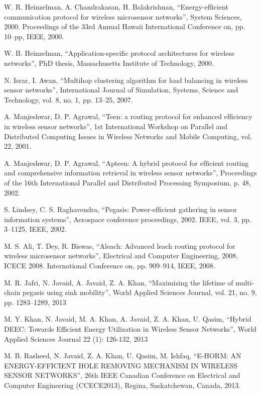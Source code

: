 \documentclass[journal]{IEEEtran}
\begin{document}
\begin{thebibliography}{1}
W. R. Heinzelman, A. Chandrakasan, H. Balakrishnan, ``Energy-efﬁcient communication protocol for wireless microsensor networks'', System Sciences, 2000. Proceedings of the 33rd Annual Hawaii International Conference on, pp. 10–pp, IEEE, 2000.

W. B. Heinzelman, ``Application-speciﬁc protocol architectures for wireless networks'', PhD thesis, Massachusetts Institute of Technology, 2000.

N. Israr, I. Awan, ``Multihop clustering algorithm for load balancing in wireless sensor networks'', International Journal of Simulation, Systems, Science and Technology, vol. 8, no. 1, pp. 13–25, 2007.

A. Manjeshwar, D. P. Agrawal, ``Teen: a routing protocol for enhanced efﬁciency in wireless sensor networks'', 1st International Workshop on Parallel and Distributed Computing Issues in Wireless Networks and Mobile Computing, vol. 22, 2001.

A. Manjeshwar, D. P. Agrawal, ``Apteen: A hybrid protocol for efﬁcient routing and comprehensive information retrieval in wireless sensor networks'', Proceedings of the 16th International Parallel and Distributed Processing Symposium, p. 48, 2002.

S. Lindsey, C. S. Raghavendra, ``Pegasis: Power-efﬁcient gathering in sensor information systems'', Aerospace conference proceedings, 2002. IEEE, vol. 3, pp. 3–1125, IEEE, 2002.

M. S. Ali, T. Dey, R. Biswas, ``Aleach: Advanced leach routing protocol for wireless microsensor networks'', Electrical and Computer Engineering, 2008. ICECE 2008. International Conference on, pp. 909–914, IEEE, 2008.

M. R. Jafri, N. Javaid, A. Javaid, Z. A. Khan, ``Maximizing the lifetime of multi-chain pegasis using sink mobility'', World Applied Sciences Journal, vol. 21, no. 9, pp. 1283–1289, 2013

M. Y. Khan, N. Javaid, M. A. Khan, A. Javaid, Z. A. Khan, U. Qasim, ``Hybrid DEEC: Towards Efficient Energy Utilization in Wireless Sensor Networks'', World Applied Sciences Journal 22 (1): 126-132, 2013

M. B. Rasheed, N. Javaid, Z. A. Khan, U. Qasim, M. Ishfaq, ``E-HORM: AN ENERGY-EFFICIENT HOLE REMOVING MECHANISM IN WIRELESS SENSOR NETWORKS'', 26th IEEE Canadian Conference on Electrical and Computer Engineering (CCECE2013), Regina, Saskatchewan, Canada, 2013.


\end{thebibliography}
\end{document}
